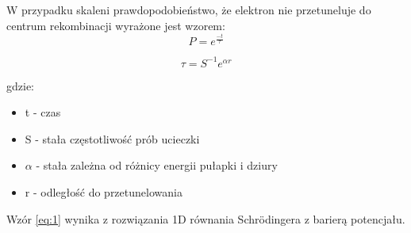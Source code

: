 W przypadku skaleni prawdopodobieństwo, że elektron nie przetuneluje do centrum rekombinacji wyrażone jest wzorem:
\cite{wzor}
\begin{equation}
\label{eq:1}
P = e^{\frac{-t}{\tau}}
\end{equation}

\begin{equation}
\label{eq:2}
\tau = S^{-1}e^{\alpha r}
\end{equation}


gdzie:
\begin{itemize}
\item t - czas
\item S - stała częstotliwość prób ucieczki
\item $\alpha$ -  stała zależna od różnicy energii pułapki i dziury
\item r - odległość do przetunelowania
\end{itemize}

Wzór \ref{eq:1} wynika z rozwiązania 1D równania Schrödingera z barierą potencjału.





